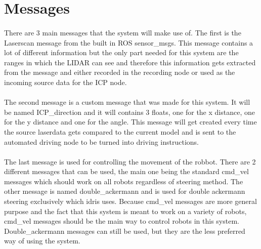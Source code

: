 
\section{Messages}
\paragraph{}
There are 3 main messages that the system will make use of. The first is the Laserscan message from the built in ROS sensor\_msgs. This message contains a lot of different information but the only part needed for this system are the ranges in which the LIDAR can see and therefore this information gets extracted from the message and either recorded in the recording node or used as the incoming source data for the ICP node.
\paragraph{}
The second message is a custom message that was made for this system. It will be named ICP\_direction and it will contains 3 floats, one for the x distance, one for the y distance and one for the angle. This message will get created every time the source laserdata gets compared to the current model and is sent to the automated driving node to be turned into driving instructions.
\paragraph{}
The last message is used for controlling the movement of the robbot. There are 2 different messages that can be used, the main one being the standard cmd\_vel messages which should work on all robots regardless of steering method. The other message is named double\_ackermann and is used for double ackermann steering exclusively which idris uses. Because cmd\_vel messages are more general purpose and the fact that this system is meant to work on a variety of robots, cmd\_vel messages should be the main way to control robots in this system. Double\_ackermann messages can still be used, but they are the less preferred way of using the system.

